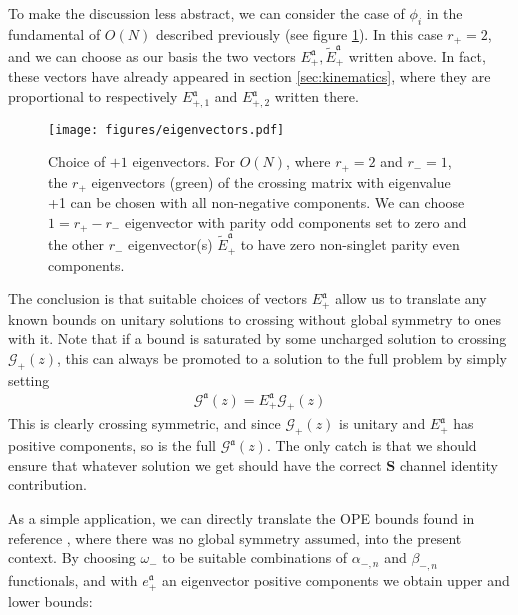 \documentclass[12pt]{article}
\numberwithin{equation}{section}
\newcommand{\ba}{\begin{equation}\begin{aligned}}
\newcommand{\ea}{\end{aligned}\end{equation}}
\newcommand{\mbf}{\mathbf}
\newcommand{\mf}[1]{\mathfrak #1}
\begin{document}
	To make the discussion less abstract, we can consider the case of $\phi_i$ in the fundamental of $O(N)$ described previously (see figure \ref{fig:eigenvectors}). In this case $r_+=2$, and we can choose as our basis the two vectors $E_{+}^{\mf a}, \tilde E_{+}^{\mf a}$ written above. In fact, these vectors have already appeared in section \ref{sec:kinematics}, where they are proportional to respectively  $E_{+,1}^{\mf a}$ and $E_{+,2}^{\mf a}$ written there.
	
		\begin{figure}[t]
		\begin{center}
				\texttt{[image: figures/eigenvectors.pdf]}
			\caption{\label{fig:eigenvectors} Choice of $+1$ eigenvectors. For $O(N)$, where $r_+=2$ and $r_-=1$, the $r_+$ eigenvectors (green) of the crossing matrix with eigenvalue +1 can be chosen with all non-negative components. We can choose $1=r_+-r_-$ eigenvector with parity odd components set to zero and the other $r_-$ eigenvector(s) $\tilde{E}_+^{\mf a}$ to have zero non-singlet parity even components.}
		\end{center}
	\end{figure}
	
	The conclusion is that suitable choices of vectors $E_+^{\mf a}$ allow us to translate any known bounds on unitary solutions to crossing without global symmetry to ones with it. Note that if a bound is saturated by some uncharged solution to crossing $\mathcal G_+(z)$, this can always be promoted to a solution to the full problem by simply setting
	\ba
	\mathcal G^{\mf a}(z)=E_+^{\mf a} \mathcal G_{+}(z)
	\ea
	This is clearly crossing symmetric, and since $\mathcal G_+(z)$ is unitary and $E_{+}^{\mf a}$ has positive components, so is the full $\mathcal G^{\mf a}(z)$. The only catch is that we should ensure that whatever solution we get should have the correct $\mbf S$ channel identity contribution.
	
	As a simple application, we can directly translate the OPE bounds found in reference \cite{Mazac:2018ycv}, where there was no global symmetry assumed, into the present context. By choosing $\omega_-$ to be suitable combinations of $\alpha_{-,n}$ and $\beta_{-,n}$ functionals, and with $e_+^{\mf a}$ an eigenvector positive components we obtain upper and lower bounds:
	
\end{document}
